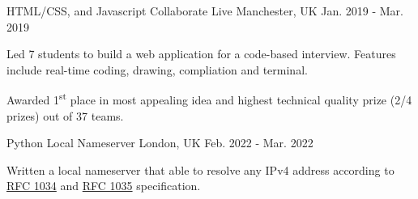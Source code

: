 \begin{cventries}
    \cventry
    {HTML/CSS, and Javascript} %
    {Collaborate Live} %
    {Manchester, UK} %
    {Jan. 2019 - Mar. 2019} %
    {
      \begin{cvitems} %
        \item {Led 7 students to build a web application for a code-based interview. Features include real-time coding, drawing, compliation and terminal.}
        \item {Awarded 1\textsuperscript{st} place in most appealing idea and highest technical quality prize (2/4 prizes) out of 37 teams.}
      \end{cvitems}
    }

  \cventry
    {Python} %
    {Local Nameserver} %
    {London, UK} %
    {Feb. 2022 - Mar. 2022} %
    {
      \begin{cvitems} %
        \item {Written a local nameserver that able to resolve any IPv4 address according to \href{https://datatracker.ietf.org/doc/html/rfc1034}{RFC 1034} and \href{https://datatracker.ietf.org/doc/html/rfc1035}{RFC 1035} specification.}
      \end{cvitems}
    }





\end{cventries}
